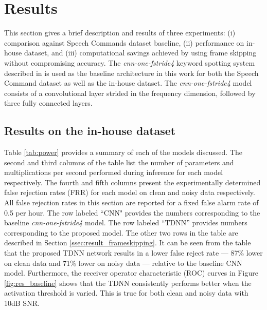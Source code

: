\documentclass{article}
\begin{document}
\section{Results}
\label{sec:results}
This section gives a brief description and results of three experiments: (i) comparison against Speech Commands dataset baseline, (ii) performance on in-house dataset, and (iii) computational savings achieved by using frame skipping without compromising accuracy. The \textit{cnn-one-fstride4} keyword spotting system described in \cite{Sainath15} is used as the baseline architecture in this work for both the Speech Command dataset as well as the in-house dataset.  The \textit{cnn-one-fstride4} model consists of a convolutional layer strided in the frequency dimension, followed by three fully connected layers.

\subsection{Results on the in-house dataset}

Table \ref{tab:power} provides a summary of each of the models discussed.  The second and third columns of the table list the number of parameters and multiplications per second performed during inference for each model respectively.  The fourth and fifth columns present the experimentally determined false rejection rates (FRR) for each model on clean and noisy data respectively.  All false rejection rates in this section are reported for a fixed false alarm rate of 0.5 per hour. The row labeled ``CNN" provides the numbers corresponding to the baseline \textit{cnn-one-fstride4} model. The row labeled ``TDNN'' provides numbers corresponding to the proposed model. The other two rows in the table are described in Section \ref{ssec:result_frameskipping}. It can be seen from the table that the proposed TDNN network results in a lower false reject rate --- 87\% lower on clean data and 71\% lower on noisy data --- relative to the baseline CNN model.  Furthermore, the receiver operator characteristic (ROC) curves in Figure \ref{fig:res_baseline} shows that the TDNN consistently performs better when the activation threshold is varied.  This is true for both clean and noisy data with 10dB SNR.
\end{document}
